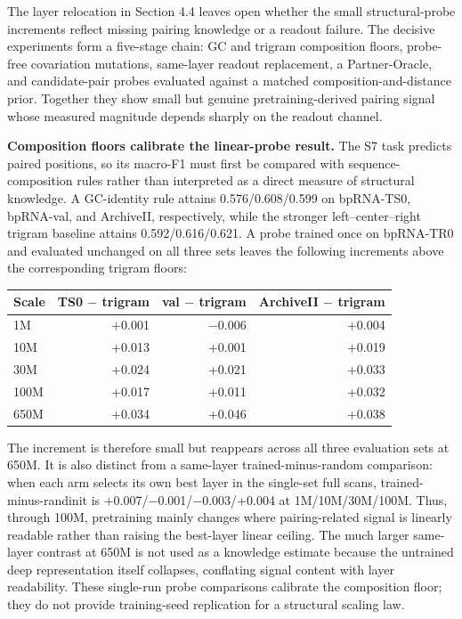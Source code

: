 The layer relocation in Section 4.4 leaves open whether the small structural-probe increments reflect missing pairing knowledge or a readout failure. The decisive experiments form a five-stage chain: GC and trigram composition floors, probe-free covariation mutations, same-layer readout replacement, a Partner-Oracle, and candidate-pair probes evaluated against a matched composition-and-distance prior. Together they show small but genuine pretraining-derived pairing signal whose measured magnitude depends sharply on the readout channel.

\textbf{Composition floors calibrate the linear-probe result.} The S7 task predicts paired positions, so its macro-F1 must first be compared with sequence-composition rules rather than interpreted as a direct measure of structural knowledge. A GC-identity rule attains 0.576/0.608/0.599 on bpRNA-TS0, bpRNA-val, and ArchiveII, respectively, while the stronger left--center--right trigram baseline attains 0.592/0.616/0.621. A probe trained once on bpRNA-TR0 and evaluated unchanged on all three sets leaves the following increments above the corresponding trigram floors:

\begin{longtable}[]{@{}lrrr@{}}
\toprule
Scale & TS0 \(-\) trigram & val \(-\) trigram & ArchiveII \(-\) trigram \\
\midrule
\endhead
1M & +0.001 & \(-\)0.006 & +0.004 \\
10M & +0.013 & +0.001 & +0.019 \\
30M & +0.024 & +0.021 & +0.033 \\
100M & +0.017 & +0.011 & +0.032 \\
650M & +0.034 & +0.046 & +0.038 \\
\bottomrule
\end{longtable}

The increment is therefore small but reappears across all three evaluation sets at 650M. It is also distinct from a same-layer trained-minus-random comparison: when each arm selects its own best layer in the single-set full scans, trained-minus-randinit is +0.007/\(-\)0.001/\(-\)0.003/+0.004 at 1M/10M/30M/100M. Thus, through 100M, pretraining mainly changes where pairing-related signal is linearly readable rather than raising the best-layer linear ceiling. The much larger same-layer contrast at 650M is not used as a knowledge estimate because the untrained deep representation itself collapses, conflating signal content with layer readability. These single-run probe comparisons calibrate the composition floor; they do not provide training-seed replication for a structural scaling law.

